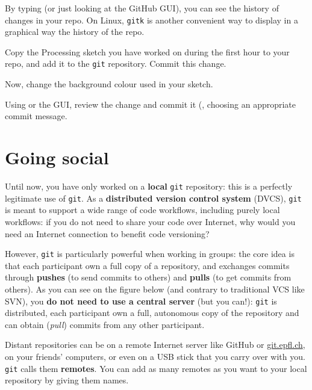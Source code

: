 \documentclass{instructions}
\newcommand{\git}{\texttt{git}\xspace}
\begin{document}

By typing  (or just looking at the GitHub GUI), you can see the
history of changes in your repo. On Linux, \texttt{gitk} is another
convenient way to display in a graphical way the history of the repo.


Copy the Processing sketch you have worked on during the first hour to your
repo, and add it to the \git repository. Commit this change.

Now, change the background colour used in your sketch.

Using  or the GUI, review the change and commit it (, choosing an appropriate commit message.

\part{Going social}

Until now, you have only worked on a \textbf{local} \git repository: this is a
perfectly legitimate use of \git. As a \textbf{distributed version control
system} (DVCS), \git is meant to support a wide range of code workflows,
including purely local workflows: if you do not need to share your code over
Internet, why would you need an Internet connection to benefit code versioning?

However, \git is particularly powerful when working in groups: the core idea is
that each participant own a full copy of a repository, and exchanges commits
through \textbf{pushes} (to send commits to others) and \textbf{pulls} (to get
commits from others). As you can see on the figure below (and contrary to
traditional VCS like SVN), you \textbf{do not
need to use a central server} (but you can!): \git is distributed, each
participant own a full, autonomous copy of the repository and can obtain
(\emph{pull}) commits from any other participant.

\begin{center}
\end{center}

Distant repositories can be on a remote Internet server like GitHub or
\url{git.epfl.ch}, on your friends' computers,
or even on a USB stick that you carry over with you. \git calls them
\textbf{remotes}. You can add as many remotes as you want to your local
repository by giving them names.
\end{document}
